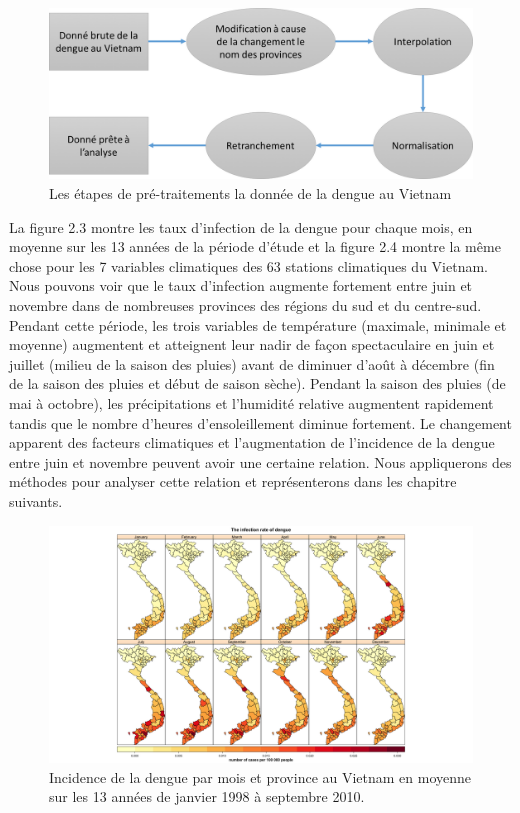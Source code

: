 \begin{figure}[h]
\includegraphics[width = \linewidth]{../figures/chap2/Pic2_1.png}
\caption{Les étapes de pré-traitements la donnée de la dengue au Vietnam}
\label{Pic2_1}	
\end{figure}
La figure 2.3 montre les taux d'infection de la dengue pour chaque mois, en moyenne sur les 13 années de la période d'étude et la figure 2.4 montre la même chose pour les 7 variables climatiques des 63 stations climatiques du Vietnam. Nous pouvons voir que le taux d'infection augmente fortement entre juin et novembre dans de nombreuses provinces des régions du sud et du centre-sud. Pendant cette période, les trois variables de température (maximale, minimale et moyenne) augmentent et atteignent leur nadir de façon spectaculaire en juin et juillet (milieu de la saison des pluies) avant de diminuer d'août à décembre (fin de la saison des pluies et début de saison sèche). Pendant la saison des pluies (de mai à octobre), les précipitations et l'humidité relative augmentent rapidement tandis que le nombre d'heures d'ensoleillement diminue fortement. 
Le changement apparent des facteurs climatiques et l'augmentation de l'incidence de la dengue entre juin et novembre peuvent avoir une certaine relation. Nous  appliquerons des méthodes pour analyser cette relation et représenterons dans les chapitre suivants. 
\begin{figure}[h]
\includegraphics[width = \linewidth]{../figures/chap2/Pic2_2.png}
\caption{Incidence de la dengue par mois et province au Vietnam en moyenne sur les 13 années de janvier 1998 à septembre 2010.}
\label{Pic2_2}	
\end{figure}


